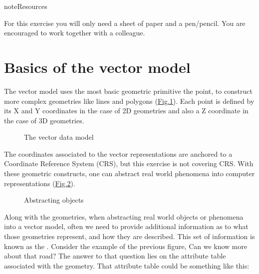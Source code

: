 \documentclass[letterpaper,10pt,english]{sphinxmanual}
\begin{document}
\begin{sphinxadmonition}{note}{Resources}

\begin{DUlineblock}{0em}
\item[] For this exercise you will only need a sheet of paper and a pen/pencil. You are encouraged to work together with a colleague.
\end{DUlineblock}
\end{sphinxadmonition}


\section{Basics of the vector model}
\label{\detokenize{vector_representations:basics-of-the-vector-model}}
The vector model uses the most basic geometric primitive \sphinxhyphen{} the point, to construct more complex geometries like lines and polygons (\hyperref[\detokenize{vector_representations:the-vector-data-model}]{Fig.\@ \ref{\detokenize{vector_representations:the-vector-data-model}}}).
Each point is defined by its X and Y coordinates in the case of 2D geometries and also a Z coordinate in the case of 3D geometries.

\begin{figure}[htbp]
\centering
\capstart

\noindent{}
\caption{The vector data model}\label{\detokenize{vector_representations:id1}}\label{\detokenize{vector_representations:the-vector-data-model}}\end{figure}

The coordinates associated to the vector representations are anchored to a Coordinate Reference System (CRS), but this exercise is not covering CRS.
With these geometric constructs, one can abstract real world phenomena into computer representations (\hyperref[\detokenize{vector_representations:abstracting-objects}]{Fig.\@ \ref{\detokenize{vector_representations:abstracting-objects}}}).

\begin{figure}[htbp]
\centering
\capstart

\noindent{}
\caption{Abstracting objects}\label{\detokenize{vector_representations:id2}}\label{\detokenize{vector_representations:abstracting-objects}}\end{figure}

Along with the geometries, when abstracting real world objects or phenomena into a vector model, often we need to provide additional information
as to what those geometries represent, and how they are described. This set of information is known as the . Consider the example of the previous figure,
Can we know more about that road? The answer to that question lies on the attribute table associated with the geometry. That attribute table could be something like this:
\end{document}
